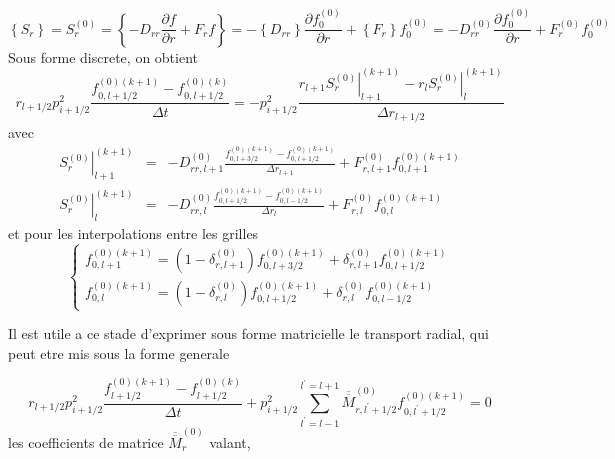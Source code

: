 \[
\left\{ S_{r}\right\} =S_{r}^{\left(0\right)}=\left\{ -D_{rr}\frac{\partial f}{\partial r}+F_{r}f\right\} =-\left\{ D_{rr}\right\} \frac{\partial f_{0}^{\left(0\right)}}{\partial r}+\left\{ F_{r}\right\} f_{0}^{\left(0\right)}=-D_{rr}^{\left(0\right)}\frac{\partial f_{0}^{\left(0\right)}}{\partial r}+F_{r}^{\left(0\right)}f_{0}^{\left(0\right)}\]
 Sous forme discrete, on obtient \[
r_{l+1/2}p_{i+1/2}^{2}\frac{f_{0,l+1/2}^{\left(0\right)(k+1)}-f_{0,l+1/2}^{\left(0\right)(k)}}{\Delta t}=-p_{i+1/2}^{2}\frac{r_{l+1}\left.S_{r}^{\left(0\right)}\right|_{l+1}^{(k+1)}-r_{l}\left.S_{r}^{\left(0\right)}\right|_{l}^{(k+1)}}{\Delta r_{l+1/2}}\]
 avec \begin{eqnarray*}
\left.S_{r}^{\left(0\right)}\right|_{l+1}^{(k+1)} & = & -D_{rr,l+1}^{\left(0\right)}\frac{f_{0,l+3/2}^{\left(0\right)(k+1)}-f_{0,l+1/2}^{\left(0\right)(k+1)}}{\Delta r_{l+1}}+F_{r,l+1}^{\left(0\right)}f_{0,l+1}^{\left(0\right)(k+1)}\\
\left.S_{r}^{\left(0\right)}\right|_{l}^{(k+1)} & = & -D_{rr,l}^{\left(0\right)}\frac{f_{0,l+1/2}^{\left(0\right)(k+1)}-f_{0,l-1/2}^{\left(0\right)(k+1)}}{\Delta r_{l}}+F_{r,l}^{\left(0\right)}f_{0,l}^{\left(0\right)(k+1)}\end{eqnarray*}
 et pour les interpolations entre les grilles \[
\left\{ \begin{array}{l}
f_{0,l+1}^{\left(0\right)(k+1)}=\left(1-\delta_{r,l+1}^{\left(0\right)}\right)f_{0,l+3/2}^{\left(0\right)(k+1)}+\delta_{r,l+1}^{\left(0\right)}f_{0,l+1/2}^{\left(0\right)(k+1)}\\
f_{0,l}^{\left(0\right)(k+1)}=\left(1-\delta_{r,l}^{\left(0\right)}\right)f_{0,l+1/2}^{\left(0\right)(k+1)}+\delta_{r,l}^{\left(0\right)}f_{0,l-1/2}^{\left(0\right)(k+1)}\end{array}\right.\]


Il est utile a ce stade d'exprimer sous forme matricielle le transport
radial, qui peut etre mis sous la forme generale

\[
r_{l+1/2}p_{i+1/2}^{2}\frac{f_{l+1/2}^{\left(0\right)(k+1)}-f_{l+1/2}^{\left(0\right)\left(k\right)}}{\Delta t}+p_{i+1/2}^{2}\sum_{l^{\prime}=l-1}^{l^{\prime}=l+1}\overline{\overline{M}}_{r,l^{\prime}+1/2}^{\left(0\right)}f_{0,l^{\prime}+1/2}^{\left(0\right)(k+1)}=0\]
 les coefficients de matrice $\overline{\overline{M}}_{r}^{\left(0\right)}$
valant,


